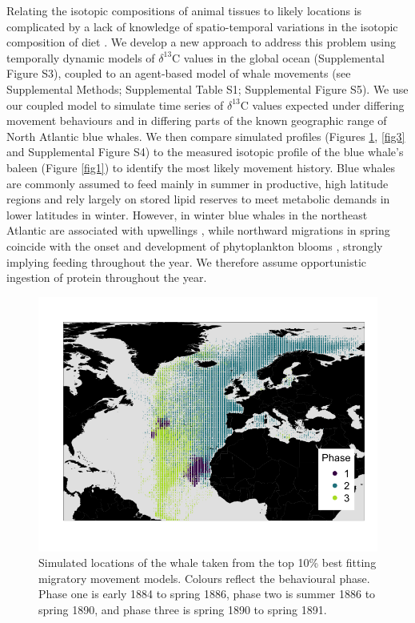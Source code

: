\documentclass[9pt,twocolumn,twoside,lineno]{pnas-new}
\begin{document}
Relating the isotopic compositions of animal tissues to likely locations is complicated by a lack of knowledge of spatio-temporal variations in the isotopic composition of diet \cite{west2006stable,mcmahon2015millennial}.
We develop a new approach to address this problem using temporally dynamic models of $\delta^{13}$C values in the global ocean \cite{magozzi2017using} (Supplemental Figure S3), coupled to an agent-based model of whale movements (see Supplemental Methods; Supplemental Table S1; Supplemental Figure S5).  
We use our coupled model to simulate time series of $\delta^{13}$C values expected under differing movement behaviours and in differing parts of the known geographic range of North Atlantic blue whales. 
We then compare simulated profiles (Figures \ref{fig2}, \ref{fig3} and Supplemental Figure S4) to the measured isotopic profile of the blue whale's baleen (Figure \ref{fig1}) to identify the most likely movement history. 
Blue whales are commonly assumed to feed mainly in summer in productive, high latitude regions and rely largely on stored lipid reserves to meet metabolic demands in lower latitudes in winter. 
However, in winter blue whales in the northeast Atlantic are associated with upwellings \cite{baines2017autumn}, while northward migrations in spring coincide with the onset and development of phytoplankton blooms \cite{silva2013north,visser2011timing,busquets2017estimating}, strongly implying feeding throughout the year. 
We therefore assume opportunistic ingestion of protein throughout the year. 

\begin{figure}
 \centering
 \includegraphics[width = \linewidth]{figures/Figure-2-points.png}
  \caption{Simulated locations of the whale taken from the top 10\% best fitting migratory movement models. 
  Colours reflect the behavioural phase. 
  Phase one is early 1884 to spring 1886, phase two is summer 1886 to spring 1890, and phase three is spring 1890 to spring 1891.}
  \label{fig2}
\end{figure}
\end{document}
